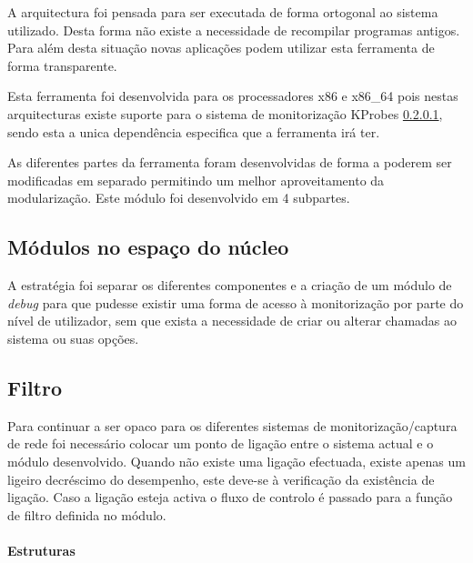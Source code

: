 A arquitectura foi pensada para ser executada de forma ortogonal ao sistema
utilizado. Desta forma não existe a necessidade de recompilar programas
antigos. Para além desta situação novas aplicações podem utilizar esta
ferramenta de forma transparente.

Esta ferramenta foi desenvolvida para os processadores x86 e x86\_64 pois nestas
arquitecturas existe suporte para o sistema de monitorização KProbes \ref{},
sendo esta a unica dependência especifica que a ferramenta irá ter.

As diferentes partes da ferramenta foram desenvolvidas de forma a poderem ser
modificadas em separado permitindo um melhor aproveitamento da modularização.
Este módulo foi desenvolvido em 4 subpartes. 

\subsection{Módulos no espaço do núcleo}
A estratégia foi separar os diferentes componentes e a criação de um módulo de \textit{debug} para que pudesse existir uma forma de acesso à monitorização por parte do nível de utilizador, sem que exista a necessidade de criar ou alterar chamadas ao sistema ou suas opções.

\subsection{Filtro}

Para continuar a ser opaco para os diferentes sistemas de monitorização/captura de rede foi necessário colocar um ponto de ligação entre o sistema actual e o módulo desenvolvido. Quando não existe uma ligação efectuada, existe apenas um ligeiro decréscimo do desempenho, este deve-se à verificação da existência de ligação. Caso a ligação esteja activa o fluxo de controlo é passado para a função de filtro definida no módulo.


\paragraph{Estruturas}


